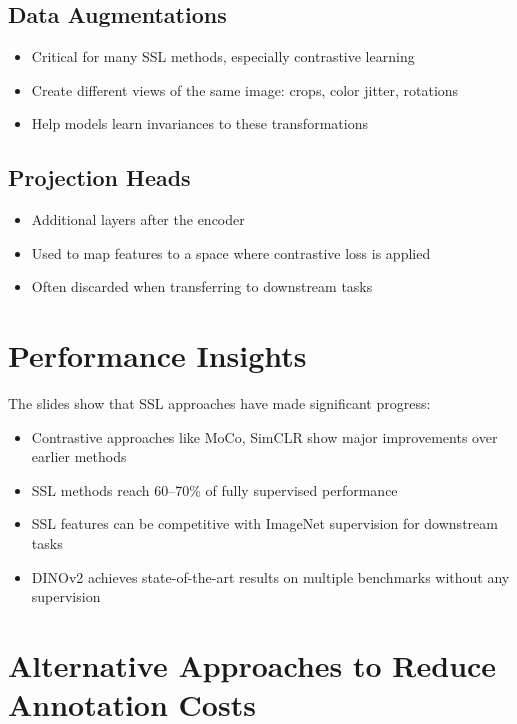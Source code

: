 \subsection*{Data Augmentations}
\begin{itemize}
    \item Critical for many SSL methods, especially contrastive learning
    \item Create different views of the same image: crops, color jitter, rotations
    \item Help models learn invariances to these transformations
\end{itemize}

\subsection*{Projection Heads}
\begin{itemize}
    \item Additional layers after the encoder
    \item Used to map features to a space where contrastive loss is applied
    \item Often discarded when transferring to downstream tasks
\end{itemize}

\section*{Performance Insights}
The slides show that SSL approaches have made significant progress:
\begin{itemize}
    \item Contrastive approaches like MoCo, SimCLR show major improvements over earlier methods
    \item SSL methods reach 60--70\% of fully supervised performance
    \item SSL features can be competitive with ImageNet supervision for downstream tasks
    \item DINOv2 achieves state-of-the-art results on multiple benchmarks without any supervision
\end{itemize}
\section*{Alternative Approaches to Reduce Annotation Costs}

